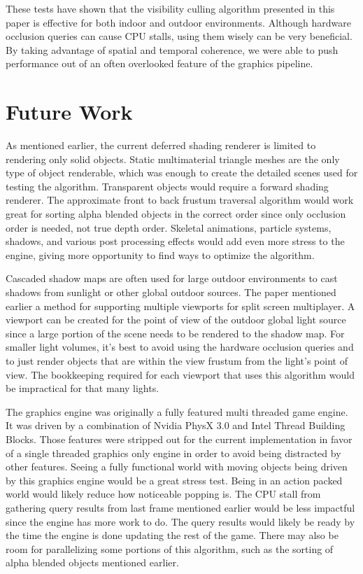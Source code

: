 \documentclass[12pt]{ucthesis}
\begin{document}
These tests have shown that the visibility culling algorithm presented in this paper is effective for both indoor and outdoor environments.
Although hardware occlusion queries can cause CPU stalls, using them wisely can be very beneficial.
By taking advantage of spatial and temporal coherence, we were able to push performance out of an often overlooked feature of the graphics pipeline.

\chapter{Future Work}
\label{future-work}
As mentioned earlier, the current deferred shading renderer is limited to rendering only solid objects.
Static multimaterial triangle meshes are the only type of object renderable, which was enough to create the detailed scenes used for testing the algorithm.
Transparent objects would require a forward shading renderer.
The approximate front to back frustum traversal algorithm would work great for sorting alpha blended objects in the correct order since only occlusion order is needed, not true depth order.
Skeletal animations, particle systems, shadows, and various post processing effects would add even more stress to the engine, giving more opportunity to find ways to optimize the algorithm.

Cascaded shadow maps are often used for large outdoor environments to cast shadows from sunlight or other global outdoor sources.\cite{ms-cascaded-shadow}
The paper mentioned earlier a method for supporting multiple viewports for split screen multiplayer.
A viewport can be created for the point of view of the outdoor global light source since a large portion of the scene needs to be rendered to the shadow map.
For smaller light volumes, it's best to avoid using the hardware occlusion queries and to just render objects that are within the view frustum from the light's point of view.
The bookkeeping required for each viewport that uses this algorithm would be impractical for that many lights.

The graphics engine was originally a fully featured multi threaded game engine.
It was driven by a combination of Nvidia PhysX 3.0 and Intel Thread Building Blocks.
Those features were stripped out for the current implementation in favor of a single threaded graphics only engine in order to avoid being distracted by other features.
Seeing a fully functional world with moving objects being driven by this graphics engine would be a great stress test.
Being in an action packed world would likely reduce how noticeable popping is.
The CPU stall from gathering query results from last frame mentioned earlier would be less impactful since the engine has more work to do.
The query results would likely be ready by the time the engine is done updating the rest of the game.
There may also be room for parallelizing some portions of this algorithm, such as the sorting of alpha blended objects mentioned earlier.


\clearpage


\end{document}
